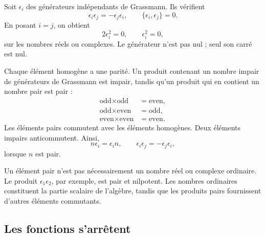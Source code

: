 Soit \(\epsilon_i\) des générateurs indépendants de Grassmann. Ils vérifient
\begin{equation}
\epsilon_i\epsilon_j=-\epsilon_j\epsilon_i,
\qquad
\{\epsilon_i,\epsilon_j\}=0.
\end{equation}
En posant \(i=j\), on obtient
\begin{equation}
2\epsilon_i^2=0,
\qquad
\epsilon_i^2=0,
\end{equation}
sur les nombres réels ou complexes. Le générateur n’est pas nul ; seul son carré est nul.

Chaque élément homogène a une parité. Un produit contenant un nombre impair de générateurs de Grassmann est impair, tandis qu’un produit qui en contient un nombre pair est pair :
\begin{align}
\text{odd}\times\text{odd}&=\text{even},\\
\text{odd}\times\text{even}&=\text{odd},\\
\text{even}\times\text{even}&=\text{even}.
\end{align}
Les éléments pairs commutent avec les éléments homogènes. Deux éléments impairs anticommutent. Ainsi,
\begin{equation}
n\epsilon_i=\epsilon_i n,
\qquad
\epsilon_i\epsilon_j=-\epsilon_j\epsilon_i,
\end{equation}
lorsque \(n\) est pair.

Un élément pair n’est pas nécessairement un nombre réel ou complexe ordinaire. Le produit
\(\epsilon_1\epsilon_2\), par exemple, est pair et nilpotent. Les nombres ordinaires constituent la partie scalaire de l’algèbre, tandis que les produits pairs fournissent d’autres éléments commutants.

\begin{classroomqa}
\end{classroomqa}

\subsection{Les fonctions s’arrêtent}


